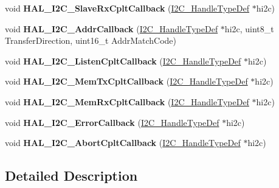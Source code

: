 \begin{DoxyCompactItemize}
\item 
\mbox{\label{group___i2_c___i_r_q___handler__and___callbacks_gae23a5b1ce68867c35093ff2b5931e9a0}} 
void {\bfseries H\+A\+L\+\_\+\+I2\+C\+\_\+\+Slave\+Rx\+Cplt\+Callback} (\hyperlink{struct_____i2_c___handle_type_def}{I2\+C\+\_\+\+Handle\+Type\+Def} $\ast$hi2c)
\item 
\mbox{\label{group___i2_c___i_r_q___handler__and___callbacks_ga3b2a6a0ff585d8e529a73ba7d291c92d}} 
void {\bfseries H\+A\+L\+\_\+\+I2\+C\+\_\+\+Addr\+Callback} (\hyperlink{struct_____i2_c___handle_type_def}{I2\+C\+\_\+\+Handle\+Type\+Def} $\ast$hi2c, uint8\+\_\+t Transfer\+Direction, uint16\+\_\+t Addr\+Match\+Code)
\item 
\mbox{\label{group___i2_c___i_r_q___handler__and___callbacks_ga22544d1e6a14392cd5fe41e4e4f4cc96}} 
void {\bfseries H\+A\+L\+\_\+\+I2\+C\+\_\+\+Listen\+Cplt\+Callback} (\hyperlink{struct_____i2_c___handle_type_def}{I2\+C\+\_\+\+Handle\+Type\+Def} $\ast$hi2c)
\item 
\mbox{\label{group___i2_c___i_r_q___handler__and___callbacks_ga874f6104d2cdbced9f2ab6e941ec58f0}} 
void {\bfseries H\+A\+L\+\_\+\+I2\+C\+\_\+\+Mem\+Tx\+Cplt\+Callback} (\hyperlink{struct_____i2_c___handle_type_def}{I2\+C\+\_\+\+Handle\+Type\+Def} $\ast$hi2c)
\item 
\mbox{\label{group___i2_c___i_r_q___handler__and___callbacks_gac16a95413b35f05c5ce725fefd8531a5}} 
void {\bfseries H\+A\+L\+\_\+\+I2\+C\+\_\+\+Mem\+Rx\+Cplt\+Callback} (\hyperlink{struct_____i2_c___handle_type_def}{I2\+C\+\_\+\+Handle\+Type\+Def} $\ast$hi2c)
\item 
\mbox{\label{group___i2_c___i_r_q___handler__and___callbacks_ga4d5338cd64a656dfdc4154773bc4f05d}} 
void {\bfseries H\+A\+L\+\_\+\+I2\+C\+\_\+\+Error\+Callback} (\hyperlink{struct_____i2_c___handle_type_def}{I2\+C\+\_\+\+Handle\+Type\+Def} $\ast$hi2c)
\item 
\mbox{\label{group___i2_c___i_r_q___handler__and___callbacks_gaa4c2f59ea15698a1490401e5bbc3f296}} 
void {\bfseries H\+A\+L\+\_\+\+I2\+C\+\_\+\+Abort\+Cplt\+Callback} (\hyperlink{struct_____i2_c___handle_type_def}{I2\+C\+\_\+\+Handle\+Type\+Def} $\ast$hi2c)
\end{DoxyCompactItemize}


\subsection{Detailed Description}
